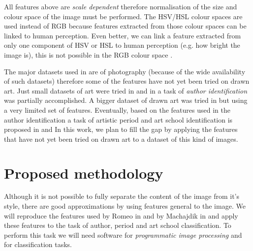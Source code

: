 \documentclass[a4paper]{article}
\begin{document}

All features above are \emph{scale dependent} \cite{rmc12ajs,mach10clas}
therefore normalisation of the size and colour space of the image must be
performed.  The HSV/HSL colour spaces are used instead of RGB because features
extracted from those colour spaces can be linked to human perception.  Even
better, we can link a feature extracted from only one component of HSV or HSL
to human perception (e.g. how bright the image is), this is not possible in the
RGB colour space \cite{rmc12ajs}.

The major datasets used in \cite{rmc12ajs,mach10clas} are of photography
(because of the wide availability of such datasets) therefore some of the
features have not yet been tried on drawn art.  Just small datasets of art were
tried in \cite{mach10clas} and in \cite{rmc12ajs} a task of \emph{author
identification} was partially accomplished.  A bigger dataset of drawn art was
tried in \cite{zirnhelt07art} but using a very limited set of features.
Eventually, based on the features used in the author identification a task of
artistic period and art school identification is proposed in
\cite{zirnhelt07art} and \cite{rmc12ajs} In this work, we plan to fill the gap
by applying the features that have not yet been tried on drawn art to a dataset
of this kind of images.

\section{Proposed methodology}

Although it is not possible to fully separate the content of the image from
it's style, there are good approximations by using features general to the
image.  We will reproduce the features used by Romeo in \cite{rmc12ajs} and by
Machajdik in \cite{mach10clas} and apply these features to the task of author,
period and art school classification.  To perform this task we will need
software for \emph{programmatic image processing} and for classification tasks.
\end{document}
